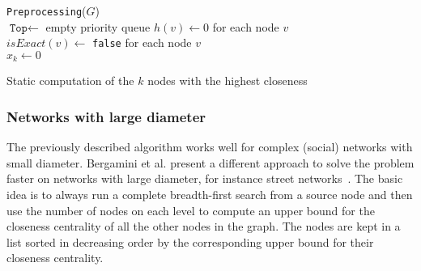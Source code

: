 \begin{algorithm2e}[h!]
 \label{alg:borassiStatic}
 \texttt{Preprocessing}($G$) \label{alg:borassiStaticPreprocessing}\\
 $\texttt{Top} \gets $ empty priority queue
 $h(v) \gets 0$ for each node $v$\\
 $isExact(v) \gets $ \texttt{false} for each node $v$\\
 $x_k \gets 0$\\

 \caption{Static computation of the $k$ nodes with the highest closeness}
\end{algorithm2e}

\subsubsection{Networks with large diameter}
The previously described algorithm works well for complex (social) networks with small diameter. Bergamini et al. present a different approach to solve the problem faster on networks with large diameter, for instance street networks~\cite{bergamini2016computing}. The basic idea is to always run a complete breadth-first search from a source node and then use the number of nodes on each level to compute an upper bound for the closeness centrality of all the other nodes in the graph. The nodes are kept in a list sorted in decreasing order by the corresponding upper bound for their closeness centrality. 

